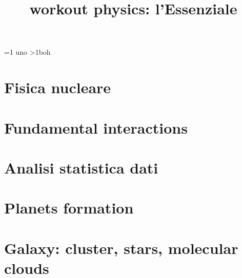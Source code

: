 \documentclass[oneside,20pt,fleqn,extrafontsizes]{memoir}
\title{workout physics: l'Essenziale}
\def\csubtoc{1}%
\begin{document}
\pagestyle{mystyle}%
\renewcommand*{\contentsname}{\label{toc}{Table of Contents}}%
\maketitle
\ifnum\csubtoc=1 uno \ifnum\csubtoc>1\else boh\fi\fi
\listoftodos
\tableofcontents*

\part{Fisica nucleare}

%

\part{Fundamental interactions}\label{intfon}




\part{Analisi statistica dati}\label{asd}




\part{Planets formation}\label{ppd}


\part{Galaxy: cluster, stars, molecular clouds}\label{stars}



\stopcontents[chapters]
\end{document}
